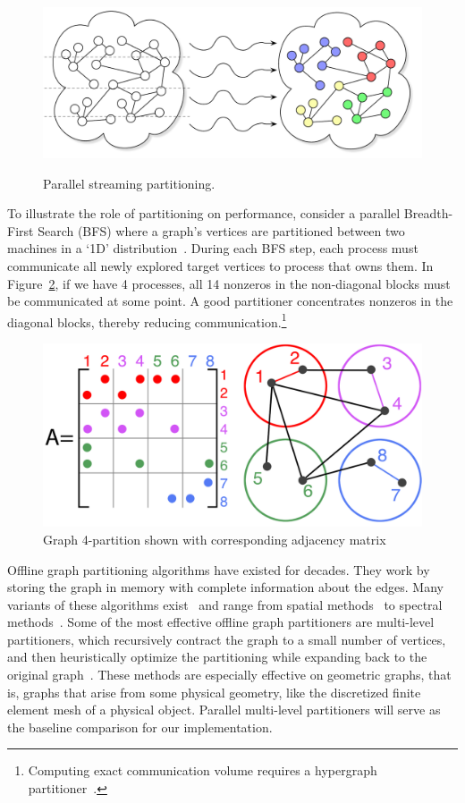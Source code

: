 \begin{figure}[ht]
\centering
  \includegraphics[width=0.7\columnwidth]{figures/coverfig.pdf}
  \label{fig:coverfig}
  \caption{Parallel streaming partitioning.}
\end{figure}

To illustrate the role of partitioning on performance, consider a parallel Breadth-First Search (BFS) where a graph's vertices are partitioned between two machines in a `1D' distribution~\cite{Buluc2D}. During each BFS step, each process must communicate all newly explored target vertices to process that owns them. In Figure~\ref{fig:0}, if we have 4 processes, all 14 nonzeros in the non-diagonal blocks must be communicated at some point. A good partitioner concentrates nonzeros in the diagonal blocks, thereby reducing communication.\footnote{Computing exact communication volume requires a hypergraph partitioner~\cite{hypergraph}.} 

\begin{figure}[h]
\centering
\includegraphics[width=0.85\columnwidth] {figures/graphpart1.pdf}
\caption[Caption for]{Graph 4-partition shown with corresponding adjacency matrix}
\label{fig:0}
\end{figure}

Offline graph partitioning algorithms have existed for dec\-ades. They work by storing the graph in memory with complete information about the edges. Many variants of these algorithms exist~\cite{gpsurvey} and range from spatial methods~\cite{Gilbert95geometricmesh} to spectral methods~\cite{arora2009expander}. Some of the most effective offline graph partitioners are multi-level partitioners, which recursively contract the graph to a small number of vertices, and then heuristically optimize the partitioning while expanding back to the original graph~\cite{karypis1998multilevel}.
These methods are especially effective on geometric graphs, that is, graphs that arise from some physical geometry, like the discretized finite element mesh of a physical object.
Parallel multi-level partitioners will serve as the baseline comparison for our implementation. 

